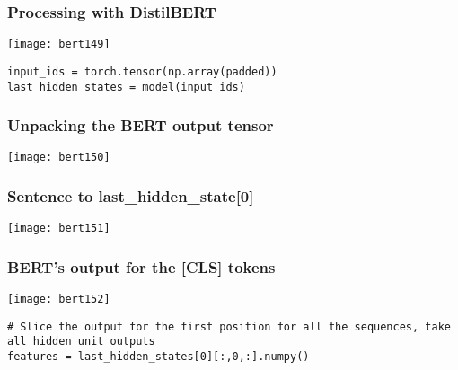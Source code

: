 \begin{frame}[fragile]\frametitle{Processing with DistilBERT}



			\begin{center}
			\texttt{[image: bert149]}
			\end{center}	

\begin{lstlisting}
input_ids = torch.tensor(np.array(padded))
last_hidden_states = model(input_ids)
\end{lstlisting}



\end{frame}

\begin{frame}[fragile]\frametitle{Unpacking the BERT output tensor}

			\begin{center}
			\texttt{[image: bert150]}
			\end{center}	


\end{frame}

\begin{frame}[fragile]\frametitle{Sentence to last\_hidden\_state[0]}

			\begin{center}
			\texttt{[image: bert151]}
			\end{center}	


\end{frame}


\begin{frame}[fragile]\frametitle{BERT’s output for the [CLS] tokens}



			\begin{center}
			\texttt{[image: bert152]}
			\end{center}	

\begin{lstlisting}
# Slice the output for the first position for all the sequences, take all hidden unit outputs 
features = last_hidden_states[0][:,0,:].numpy()
\end{lstlisting}



\end{frame}


